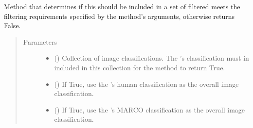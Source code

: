 \documentclass[letterpaper,10pt,english]{sphinxmanual}
\begin{document}
\begin{fulllineitems}
\begin{fulllineitems}
\begin{quote}
\begin{description}
\end{description}\end{quote}

\end{fulllineitems}


\begin{fulllineitems}
\label{\detokenize{polo.crystallography:polo.crystallography.image.Image.standard_filter}}
Method that determines if this 
{\hyperref[\detokenize{polo.crystallography:polo.crystallography.image.Image}]{}} should be
included in a set of filtered  meets the
filtering requirements specified by the method’s arguments,
otherwise returns False.
\begin{quote}\begin{description}
\item[{Parameters}] \leavevmode\begin{itemize}
\item {} 
 () \textendash{} Collection of image classifications.
The {\hyperref[\detokenize{polo.crystallography:polo.crystallography.image.Image}]{}}’s
classification must in included in this collection 
for the method to return True.

\item {} 
 () \textendash{} If True, use the 
{\hyperref[\detokenize{polo.crystallography:polo.crystallography.image.Image}]{}}’s
human classification as the
overall image classification.

\item {} 
 () \textendash{} If True, use the
{\hyperref[\detokenize{polo.crystallography:polo.crystallography.image.Image}]{}}’s
MARCO classification as the
overall image classification.


\end{itemize}
\end{description}
\end{quote}
\end{fulllineitems}
\end{fulllineitems}
\end{document}
